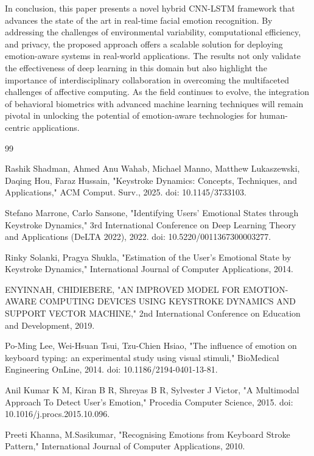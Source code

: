 \documentclass[conference]{IEEEtran}
\begin{document}
In conclusion, this paper presents a novel hybrid CNN-LSTM framework that advances the state of the art in real-time facial emotion recognition. By addressing the challenges of environmental variability, computational efficiency, and privacy, the proposed approach offers a scalable solution for deploying emotion-aware systems in real-world applications. The results not only validate the effectiveness of deep learning in this domain but also highlight the importance of interdisciplinary collaboration in overcoming the multifaceted challenges of affective computing. As the field continues to evolve, the integration of behavioral biometrics with advanced machine learning techniques will remain pivotal in unlocking the potential of emotion-aware technologies for human-centric applications.

\begin{thebibliography}{99}

Rashik Shadman, Ahmed Anu Wahab, Michael Manno, Matthew Lukaszewski, Daqing Hou, Faraz Hussain, "Keystroke Dynamics: Concepts, Techniques, and Applications," ACM Comput. Surv., 2025. doi: 10.1145/3733103.

Stefano Marrone, Carlo Sansone, "Identifying Users' Emotional States through Keystroke Dynamics," 3rd International Conference on Deep Learning Theory and Applications (DeLTA 2022), 2022. doi: 10.5220/0011367300003277.

Rinky Solanki, Pragya Shukla, "Estimation of the User's Emotional State by Keystroke Dynamics," International Journal of Computer Applications, 2014.

ENYINNAH, CHIDIEBERE, "AN IMPROVED MODEL FOR EMOTION-AWARE COMPUTING DEVICES USING KEYSTROKE DYNAMICS AND SUPPORT VECTOR MACHINE," 2nd International Conference on Education and Development, 2019.

Po-Ming Lee, Wei-Hsuan Tsui, Tzu-Chien Hsiao, "The influence of emotion on keyboard typing: an experimental study using visual stimuli," BioMedical Engineering OnLine, 2014. doi: 10.1186/2194-0401-13-81.

Anil Kumar K M, Kiran B R, Shreyas B R, Sylvester J Victor, "A Multimodal Approach To Detect User's Emotion," Procedia Computer Science, 2015. doi: 10.1016/j.procs.2015.10.096.

Preeti Khanna, M.Sasikumar, "Recognising Emotions from Keyboard Stroke Pattern," International Journal of Computer Applications, 2010.


\end{thebibliography}
\end{document}
